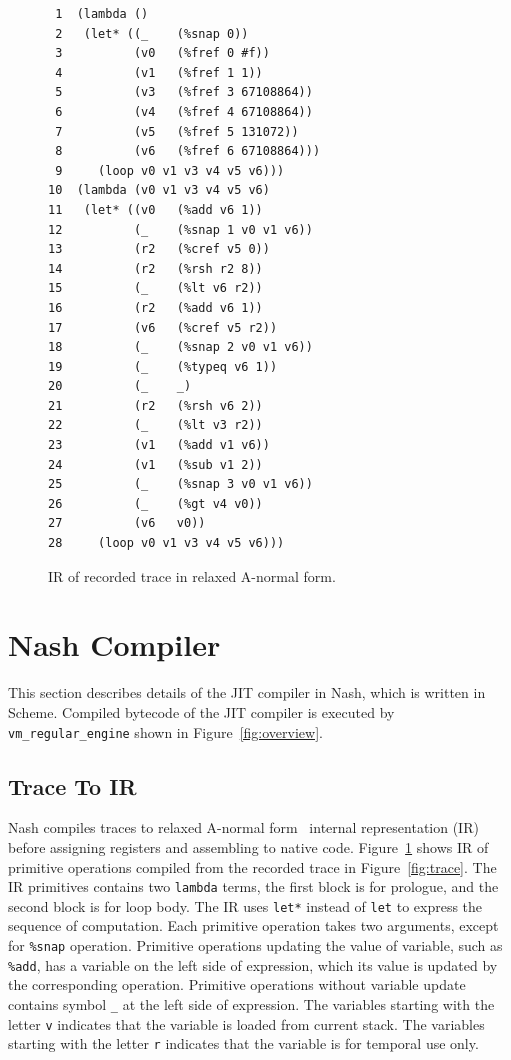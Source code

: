 \documentclass[preprint, 10pt]{sigplanconf}
\begin{document}
\begin{figure}
  \centering
  \small
\begin{verbatim}
 1  (lambda ()
 2   (let* ((_    (%snap 0))
 3          (v0   (%fref 0 #f))
 4          (v1   (%fref 1 1))
 5          (v3   (%fref 3 67108864))
 6          (v4   (%fref 4 67108864))
 7          (v5   (%fref 5 131072))
 8          (v6   (%fref 6 67108864)))
 9     (loop v0 v1 v3 v4 v5 v6)))
10  (lambda (v0 v1 v3 v4 v5 v6)
11   (let* ((v0   (%add v6 1))
12          (_    (%snap 1 v0 v1 v6))
13          (r2   (%cref v5 0))
14          (r2   (%rsh r2 8))
15          (_    (%lt v6 r2))
16          (r2   (%add v6 1))
17          (v6   (%cref v5 r2))
18          (_    (%snap 2 v0 v1 v6))
19          (_    (%typeq v6 1))
20          (_    _)
21          (r2   (%rsh v6 2))
22          (_    (%lt v3 r2))
23          (v1   (%add v1 v6))
24          (v1   (%sub v1 2))
25          (_    (%snap 3 v0 v1 v6))
26          (_    (%gt v4 v0))
27          (v6   v0))
28     (loop v0 v1 v3 v4 v5 v6)))
\end{verbatim}
\caption{IR of recorded trace in relaxed A-normal form.}
\label{fig:anf}
\end{figure}

\section{Nash Compiler}
\label{sec:compiler}

This section describes details of the JIT compiler in Nash, which is written in
Scheme. Compiled bytecode of the JIT compiler is executed by
\texttt{vm\_regular\_engine} shown in
Figure~\hyperref[fig:overview]{\ref{fig:overview}}.

\subsection{Trace To IR}
Nash compiles traces to relaxed A-normal form~\cite{flanagan1993essence}
internal representation (IR) before assigning registers and assembling to native
code. Figure~\hyperref[fig:anf]{\ref{fig:anf}} shows IR of primitive operations
compiled from the recorded trace in
Figure~\hyperref[fig:trace]{\ref{fig:trace}}. The IR primitives contains two
\texttt{lambda} terms, the first block is for prologue, and the second block is
for loop body. The IR uses \texttt{let*} instead of \texttt{let} to express the
sequence of computation. Each primitive operation takes two arguments, except
for \texttt{\%snap} operation. Primitive operations updating the value of
variable, such as \texttt{\%add}, has a variable on the left side of expression,
which its value is updated by the corresponding operation. Primitive operations
without variable update contains symbol \texttt{\_} at the left side of
expression. The variables starting with the letter \texttt{v} indicates that the
variable is loaded from current stack. The variables starting with the letter
\texttt{r} indicates that the variable is for temporal use only.
\end{document}
